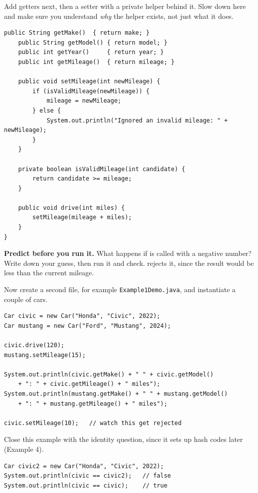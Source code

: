 \documentclass[11pt]{article}
\begin{document}
Add getters next, then a setter with a private helper behind it. Slow down here
and make sure you understand \emph{why} the helper exists, not just what it
does.

\begin{lstlisting}[style=java]
    public String getMake()  { return make; }
    public String getModel() { return model; }
    public int getYear()     { return year; }
    public int getMileage()  { return mileage; }

    public void setMileage(int newMileage) {
        if (isValidMileage(newMileage)) {
            mileage = newMileage;
        } else {
            System.out.println("Ignored an invalid mileage: " + newMileage);
        }
    }

    private boolean isValidMileage(int candidate) {
        return candidate >= mileage;
    }

    public void drive(int miles) {
        setMileage(mileage + miles);
    }
}
\end{lstlisting}

\textbf{Predict before you run it.} What happens if  is called with
a negative number? Write down your guess, then run it and check.
 rejects it, since the result would be less than the
current mileage.

Now create a second file, for example \texttt{Example1Demo.java}, and
instantiate a couple of cars.

\begin{lstlisting}[style=java]
Car civic = new Car("Honda", "Civic", 2022);
Car mustang = new Car("Ford", "Mustang", 2024);

civic.drive(120);
mustang.setMileage(15);

System.out.println(civic.getMake() + " " + civic.getModel()
    + ": " + civic.getMileage() + " miles");
System.out.println(mustang.getMake() + " " + mustang.getModel()
    + ": " + mustang.getMileage() + " miles");

civic.setMileage(10);   // watch this get rejected
\end{lstlisting}

Close this example with the identity question, since it sets up hash codes
later (Example 4).

\begin{lstlisting}[style=java]
Car civic2 = new Car("Honda", "Civic", 2022);
System.out.println(civic == civic2);   // false
System.out.println(civic == civic);    // true
\end{lstlisting}
\end{document}
